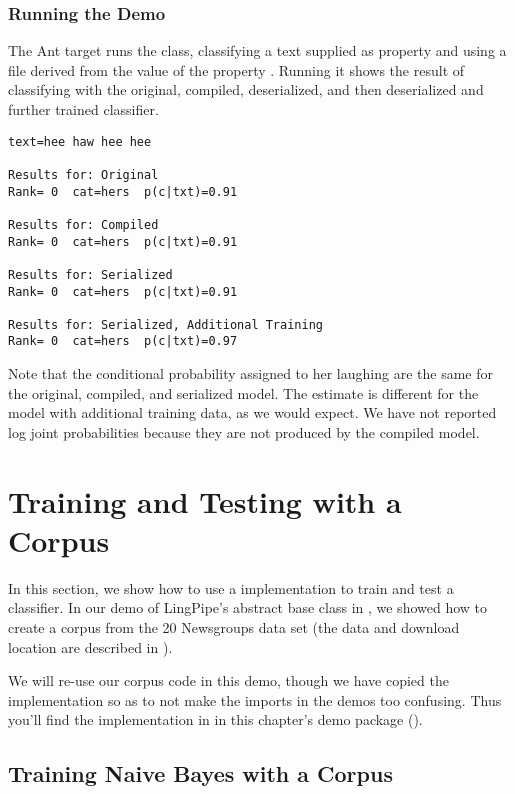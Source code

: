 \subsubsection{Running the Demo}

The Ant target  runs the class, classifying
a text supplied as property  and using a file derived
from the value of the property .  Running it shows
the result of classifying with the original, compiled, deserialized,
and then deserialized and further trained classifier.

\begin{verbatim}
text=hee haw hee hee

Results for: Original
Rank= 0  cat=hers  p(c|txt)=0.91

Results for: Compiled
Rank= 0  cat=hers  p(c|txt)=0.91

Results for: Serialized
Rank= 0  cat=hers  p(c|txt)=0.91

Results for: Serialized, Additional Training
Rank= 0  cat=hers  p(c|txt)=0.97
\end{verbatim}

Note that the conditional probability assigned to her laughing are the
same for the original, compiled, and serialized model.  The estimate
is different for the model with additional training data, as we
would expect.  We have not reported log joint probabilities because
they are not produced by the compiled model.


\section{Training and Testing with a Corpus}

In this section, we show how to use a  implementation to
train and test a classifier.  In our demo of LingPipe's 
abstract base class in , we showed
how to create a corpus from the 20 Newsgroups data set (the data
and download location are described in ).

We will re-use our corpus code in this demo, though we have copied the
implementation so as to not make the imports in the demos too
confusing.  Thus you'll find the implementation in
 in this chapter's demo package
().

\subsection{Training Naive Bayes with a Corpus}

